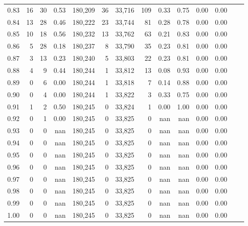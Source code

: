 \begin{tabular}{rrrrrrrrrrrrrr}
0.83 &      16 &     30 &    0.53 &  180,209 &       36 &  33,716 &     109 &  0.33 &  0.75 &  0.00 &      0.00 \\
0.84 &      13 &     28 &    0.46 &  180,222 &       23 &  33,744 &      81 &  0.28 &  0.78 &  0.00 &      0.00 \\
0.85 &      10 &     18 &    0.56 &  180,232 &       13 &  33,762 &      63 &  0.21 &  0.83 &  0.00 &      0.00 \\
0.86 &       5 &     28 &    0.18 &  180,237 &        8 &  33,790 &      35 &  0.23 &  0.81 &  0.00 &      0.00 \\
0.87 &       3 &     13 &    0.23 &  180,240 &        5 &  33,803 &      22 &  0.23 &  0.81 &  0.00 &      0.00 \\
0.88 &       4 &      9 &    0.44 &  180,244 &        1 &  33,812 &      13 &  0.08 &  0.93 &  0.00 &      0.00 \\
0.89 &       0 &      6 &    0.00 &  180,244 &        1 &  33,818 &       7 &  0.14 &  0.88 &  0.00 &      0.00 \\
0.90 &       0 &      4 &    0.00 &  180,244 &        1 &  33,822 &       3 &  0.33 &  0.75 &  0.00 &      0.00 \\
0.91 &       1 &      2 &    0.50 &  180,245 &        0 &  33,824 &       1 &  0.00 &  1.00 &  0.00 &      0.00 \\
0.92 &       0 &      1 &    0.00 &  180,245 &        0 &  33,825 &       0 &   nan &   nan &  0.00 &      0.00 \\
0.93 &       0 &      0 &     nan &  180,245 &        0 &  33,825 &       0 &   nan &   nan &  0.00 &      0.00 \\
0.94 &       0 &      0 &     nan &  180,245 &        0 &  33,825 &       0 &   nan &   nan &  0.00 &      0.00 \\
0.95 &       0 &      0 &     nan &  180,245 &        0 &  33,825 &       0 &   nan &   nan &  0.00 &      0.00 \\
0.96 &       0 &      0 &     nan &  180,245 &        0 &  33,825 &       0 &   nan &   nan &  0.00 &      0.00 \\
0.97 &       0 &      0 &     nan &  180,245 &        0 &  33,825 &       0 &   nan &   nan &  0.00 &      0.00 \\
0.98 &       0 &      0 &     nan &  180,245 &        0 &  33,825 &       0 &   nan &   nan &  0.00 &      0.00 \\
0.99 &       0 &      0 &     nan &  180,245 &        0 &  33,825 &       0 &   nan &   nan &  0.00 &      0.00 \\
1.00 &       0 &      0 &     nan &  180,245 &        0 &  33,825 &       0 &   nan &   nan &  0.00 &      0.00 \\
\bottomrule
\end{tabular}
